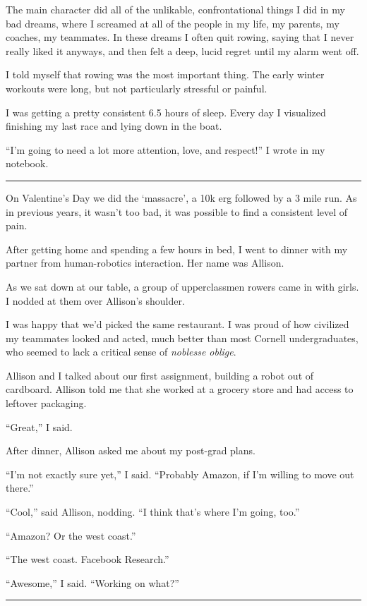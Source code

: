 The main character did all of the unlikable, confrontational things I did in my
bad dreams, where I screamed at all of the people in my life, my parents, my
coaches, my teammates.  In these dreams I often quit rowing, saying that I never
really liked it anyways, and then felt a deep, lucid regret until my alarm
went off.

I told myself that rowing was the most important thing.  The early winter
workouts were long, but not particularly stressful or painful.

I was getting a pretty consistent 6.5 hours of sleep.  Every day I visualized
finishing my last race and lying down in the boat.

``I'm going to need a lot more attention, love, and respect!'' I wrote in my
notebook.

\plainfancybreak{12pt}{2}{}

On Valentine's Day we did the `massacre', a 10k erg followed by a 3 mile run.
As in previous years, it wasn't too bad, it was possible to find a consistent
level of pain.

After getting home and spending a few hours in bed, I went to dinner with my
partner from human-robotics interaction.  Her name was Allison.

As we sat down at our table, a group of upperclassmen rowers came in with girls.
I nodded at them over Allison's shoulder.

I was happy that we'd picked the same restaurant.  I was proud of how civilized
my teammates looked and acted, much better than most Cornell undergraduates, who
seemed to lack a critical sense of \textit{noblesse oblige}.

Allison and I talked about our first assignment, building a robot out of
cardboard.  Allison told me that she worked at a grocery store and had access to
leftover packaging.

``Great,'' I said.

After dinner, Allison asked me about my post-grad plans.

``I'm not exactly sure yet,'' I said.  ``Probably Amazon, if I'm willing to move
out there.''

``Cool,'' said Allison, nodding.  ``I think that's where I'm going, too.''

``Amazon?  Or the west coast.''

``The west coast.  Facebook Research.''

``Awesome,'' I said.  ``Working on what?''

\plainfancybreak{12pt}{2}{}

